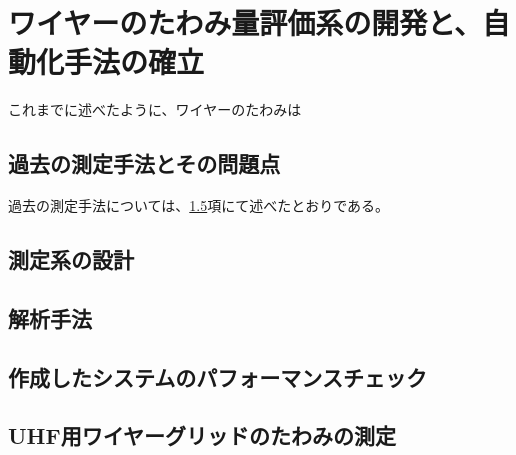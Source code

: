 \documentclass[../../main.tex]{subfiles}
\begin{document}
\chapter{ワイヤーのたわみ量評価系の開発と、自動化手法の確立}
\label{chap:wiresag}
これまでに述べたように、ワイヤーのたわみは

\section{過去の測定手法とその問題点}
過去の測定手法については、\ref{}項にて述べたとおりである。


\section{測定系の設計}

\section{解析手法}

\section{作成したシステムのパフォーマンスチェック}

\section{UHF用ワイヤーグリッドのたわみの測定}
\end{document}
